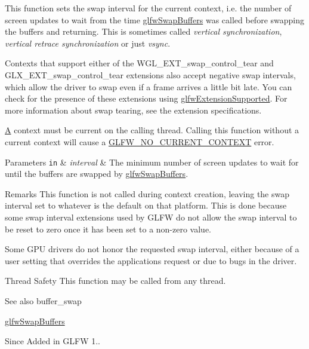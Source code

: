 This function sets the swap interval for the current context, i.\+e. the number of screen updates to wait from the time \hyperlink{group__window_gafb827800eedbfcbc97b1e5408df668d7}{glfw\+Swap\+Buffers} was called before swapping the buffers and returning. This is sometimes called {\itshape vertical synchronization}, {\itshape vertical retrace synchronization} or just {\itshape vsync}.

Contexts that support either of the {\ttfamily W\+G\+L\+\_\+\+E\+X\+T\+\_\+swap\+\_\+control\+\_\+tear} and {\ttfamily G\+L\+X\+\_\+\+E\+X\+T\+\_\+swap\+\_\+control\+\_\+tear} extensions also accept negative swap intervals, which allow the driver to swap even if a frame arrives a little bit late. You can check for the presence of these extensions using \hyperlink{group__context_ga9a28c712d35f9e43534e1d03b051c04c}{glfw\+Extension\+Supported}. For more information about swap tearing, see the extension specifications.

\hyperlink{structA}{A} context must be current on the calling thread. Calling this function without a current context will cause a \hyperlink{group__errors_gaa8290386e9528ccb9e42a3a4e16fc0d0}{G\+L\+F\+W\+\_\+\+N\+O\+\_\+\+C\+U\+R\+R\+E\+N\+T\+\_\+\+C\+O\+N\+T\+E\+X\+T} error.


\begin{DoxyParams}[1]{Parameters}
\mbox{\tt in}  & {\em interval} & The minimum number of screen updates to wait for until the buffers are swapped by \hyperlink{group__window_gafb827800eedbfcbc97b1e5408df668d7}{glfw\+Swap\+Buffers}.\\
\hline
\end{DoxyParams}
\begin{DoxyRemark}{Remarks}
This function is not called during context creation, leaving the swap interval set to whatever is the default on that platform. This is done because some swap interval extensions used by G\+L\+F\+W do not allow the swap interval to be reset to zero once it has been set to a non-\/zero value.

Some G\+P\+U drivers do not honor the requested swap interval, either because of a user setting that overrides the application\textquotesingle{}s request or due to bugs in the driver.
\end{DoxyRemark}
\begin{DoxyParagraph}{Thread Safety}
This function may be called from any thread.
\end{DoxyParagraph}
\begin{DoxySeeAlso}{See also}
buffer\+\_\+swap 

\hyperlink{group__window_gafb827800eedbfcbc97b1e5408df668d7}{glfw\+Swap\+Buffers}
\end{DoxySeeAlso}
\begin{DoxySince}{Since}
Added in G\+L\+F\+W 1.. 
\end{DoxySince}
